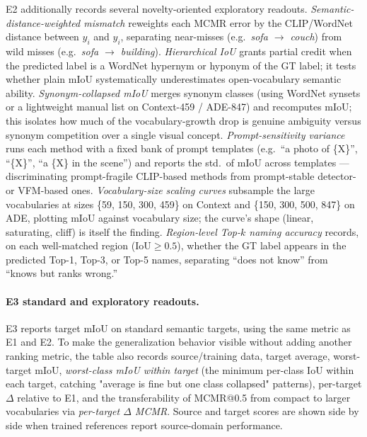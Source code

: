 \documentclass[11pt,a4paper]{article}
\begin{document}
E2 additionally records several novelty-oriented exploratory readouts. \emph{Semantic-distance-weighted mismatch} reweights each MCMR error by the CLIP/WordNet distance between $\hat{y}_i$ and $y_i$, separating near-misses (e.g.\ \emph{sofa $\to$ couch}) from wild misses (e.g.\ \emph{sofa $\to$ building}). \emph{Hierarchical IoU} grants partial credit when the predicted label is a WordNet hypernym or hyponym of the GT label; it tests whether plain mIoU systematically underestimates open-vocabulary semantic ability. \emph{Synonym-collapsed mIoU} merges synonym classes (using WordNet synsets or a lightweight manual list on Context-459 / ADE-847) and recomputes mIoU; this isolates how much of the vocabulary-growth drop is genuine ambiguity versus synonym competition over a single visual concept. \emph{Prompt-sensitivity variance} runs each method with a fixed bank of prompt templates (e.g.\ ``a photo of \{X\}'', ``\{X\}'', ``a \{X\} in the scene'') and reports the std.\ of mIoU across templates --- discriminating prompt-fragile CLIP-based methods from prompt-stable detector- or VFM-based ones. \emph{Vocabulary-size scaling curves} subsample the large vocabularies at sizes \{59, 150, 300, 459\} on Context and \{150, 300, 500, 847\} on ADE, plotting mIoU against vocabulary size; the curve's shape (linear, saturating, cliff) is itself the finding. \emph{Region-level Top-$k$ naming accuracy} records, on each well-matched region ($\mathrm{IoU}\ge 0.5$), whether the GT label appears in the predicted Top-1, Top-3, or Top-5 names, separating ``does not know'' from ``knows but ranks wrong.''

\paragraph{E3 standard and exploratory readouts.}
E3 reports target mIoU on standard semantic targets, using the same metric as E1 and E2. To make the generalization behavior visible without adding another ranking metric, the table also records source/training data, target average, worst-target mIoU, \emph{worst-class mIoU within target} (the minimum per-class IoU within each target, catching "average is fine but one class collapsed" patterns), per-target $\Delta$ relative to E1, and the transferability of MCMR@0.5 from compact to larger vocabularies via \emph{per-target $\Delta$ MCMR}. Source and target scores are shown side by side when trained references report source-domain performance.
\end{document}
